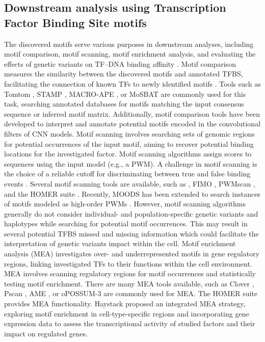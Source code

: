 \documentclass[a4paper, titlepage, openright]{book}
\begin{document}
\subsection{Downstream analysis using Transcription Factor Binding Site motifs}
The discovered motifs serve various purposes in downstream analyses, including motif comparison, motif scanning, motif enrichment analysis, and evaluating the effects of genetic variants on TF–DNA binding affinity \citep{tognon2023survey}. Motif comparison measures the similarity between the discovered motifs and annotated TFBS, facilitating the connection of known TFs to newly identified motifs \citep{gupta2007quantifying}. Tools such as Tomtom \citep{gupta2007quantifying}, STAMP \citep{mahony2007stamp}, MACRO-APE \citep{vorontsov2013jaccard}, or MoSBAT \citep{lambert2016motif} are commonly used for this task, searching annotated databases for motifs matching the input consensus sequence or inferred motif matrix. Additionally, motif comparison tools have been developed to interpret and annotate potential motifs encoded in the convolutional filters of CNN models. Motif scanning involves searching sets of genomic regions for potential occurrences of the input motif, aiming to recover potential binding locations for the investigated factor. Motif scanning algorithms assign scores to sequences using the input model (e.g., a PWM). A challenge in motif scanning is the choice of a reliable cutoff for discriminating between true and false binding events \citep{boeva2016analysis}. Several motif scanning tools are available, such as \citep{korhonen2009moods}, FIMO \citep{grant2011fimo}, PWMscan \citep{ambrosini2018pwmscan}, and the HOMER suite \citep{heinz2010simple}. Recently, MOODS has been extended to search instances of motifs modeled as high-order PWMs \citep{korhonen2017fast}. However, motif scanning algorithms generally do not consider individual- and population-specific genetic variants and haplotypes while searching for potential motif occurrences. This may result in several potential TFBS missed and missing information which could facilitate the interpretation of genetic variants impact within the cell. Motif enrichment analysis (MEA) investigates over- and underrepresented motifs in gene regulatory regions, linking investigated TFs to their functions within the cell environment. MEA involves scanning regulatory regions for motif occurrences and statistically testing motif enrichment. There are many MEA tools available, such as Clover \citep{frith2004detection}, Pscan \citep{zambelli2009pscan}, AME \citep{mcleay2010motif}, or oPOSSUM-3 \citep{kwon2012opossum} are commonly used for MEA. The HOMER suite provides MEA functionality. Haystack \citep{pinello2018haystack} proposed an integrated MEA strategy, exploring motif enrichment in cell-type-specific regions and incorporating gene expression data to assess the transcriptional activity of studied factors and their impact on regulated genes.
\end{document}
